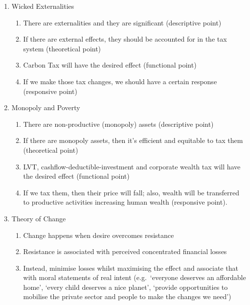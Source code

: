 \documentclass[]{tufte-handout}
\providecommand{\tightlist}{%
  \setlength{\itemsep}{0pt}\setlength{\parskip}{0pt}}
\begin{document}
\begin{enumerate}
\def\labelenumi{\arabic{enumi}.}
\tightlist
\item
  Wicked Externalities

  \begin{enumerate}
  \def\labelenumii{\arabic{enumii}.}
  \tightlist
  \item
    There are externalities and they are significant (descriptive point)
  \item
    If there are external effects, they should be accounted for in the
    tax system (theoretical point)
  \item
    Carbon Tax will have the desired effect (functional point)
  \item
    If we make those tax changes, we should have a certain response
    (responsive point)
  \end{enumerate}
\item
  Monopoly and Poverty

  \begin{enumerate}
  \def\labelenumii{\arabic{enumii}.}
  \tightlist
  \item
    There are non-productive (monopoly) assets (descriptive point)
  \item
    If there are monopoly assets, then it's efficient and equitable to
    tax them (theoretical point)
  \item
    LVT, cashflow-deductible-investment and corporate wealth tax will
    have the desired effect (functional point)
  \item
    If we tax them, then their price will fall; also, wealth will be
    transferred to productive activities increasing human wealth
    (responsive point).
  \end{enumerate}
\item
  Theory of Change

  \begin{enumerate}
  \def\labelenumii{\arabic{enumii}.}
  \tightlist
  \item
    Change happens when desire overcomes resistance
  \item
    Resistance is associated with perceived concentrated financial
    losses
  \item
    Instead, minimise losses whilst maximising the effect and associate
    that with moral statements of real intent (e.g.~`everyone deserves
    an affordable home', `every child deserves a nice planet', `provide
    opportunities to mobilise the private sector and people to make the
    changes we need')
  \end{enumerate}
\end{enumerate}
\end{document}
